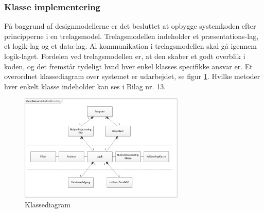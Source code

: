 \subsubsection{Klasse implementering}
På baggrund af designmodellerne er det besluttet at opbygge systemkoden efter principperne i en trelagsmodel\cite{3lagsmodel}. Trelagsmodellen indeholder et præsentations-lag, et logik-lag og et data-lag. Al kommunikation i trelagsmodellen skal gå igennem logik-laget. Fordelen ved trelagsmodellen er, at den skaber et godt overblik i koden, og det fremstår tydeligt hvad hver enkel klasses specifikke ansvar er. Et overordnet klassediagram over systemet er udarbejdet, se figur \ref{fig:KlassediagramSW}. Hvilke metoder hver enkelt klasse indeholder kan ses i Bilag nr. 13.   
\begin{figure}[H]
	\centering
	\includegraphics[width=0.7\textwidth]{Figurer/Klassediagram}
	\caption{Klassediagram}
	\label{fig:KlassediagramSW}
\end{figure}


